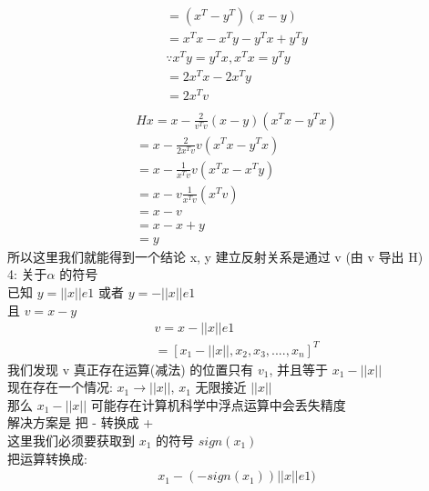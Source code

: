 \documentclass[12pt]{article}
\begin{document}
\begin{flushleft}
\begin{align}
        = (x^{T} - y^{T})(x - y)                    \\
        = x^{T}x - x^{T}y - y^{T}x + y^{T}y         \\
        \because x^{T}y = y^{T}x , x^{T}x =  y^{T}y \\
        = 2x^{T}x -2x^{T}y                          \\
        = 2x^{T}v                                   \\
    \end{align}
    \begin{align}
        Hx= x - \frac{2}{v^{T}v}(x-y)(x^{T}x - y^{T}x) \\
        =  x - \frac{2}{2x^{T}v}v(x^{T}x - y^{T}x)     \\
        =  x - \frac{1}{x^{T}v}v(x^{T}x - x^{T}y)      \\
        =  x - v\frac{1}{x^{T}v}(x^{T}v)               \\
        =  x - v                                       \\
        =  x - x + y                                   \\
        = y
    \end{align}
    所以这里我们就能得到一个结论 x, y 建立反射关系是通过 v (由 v 导出 H) \\

    4: 关于$\alpha$ 的符号 \\
    已知 $y = ||x||e1$ 或者  $ y = -||x||e1$ \\
    且 $ v = x - y$ \\
    \begin{align}
        v = x - ||x||e1 \\
        = [x_{1}- ||x||, x_{2}, x_{3}, ...., x_{n}]^{T}
    \end{align}
    我们发现 v 真正存在运算(减法) 的位置只有 $v_{1}$, 并且等于 $x_{1} - ||x||$ \\
    现在存在一个情况: $x_{1} \to ||x||$, $x_{1}$ 无限接近 $||x||$ \\
    那么 $x_{1}- ||x||$ 可能存在计算机科学中浮点运算中会丢失精度 \\
    解决方案是 把 - 转换成 + \\
    这里我们必须要获取到 $x_{1}$ 的符号 $sign(x_{1})$ \\
    把运算转换成:  \\
    \begin{align}
        x_{1} - (-sign(x_{1}))||x||e1) \\
    \end{align}


\end{flushleft}
\end{document}
